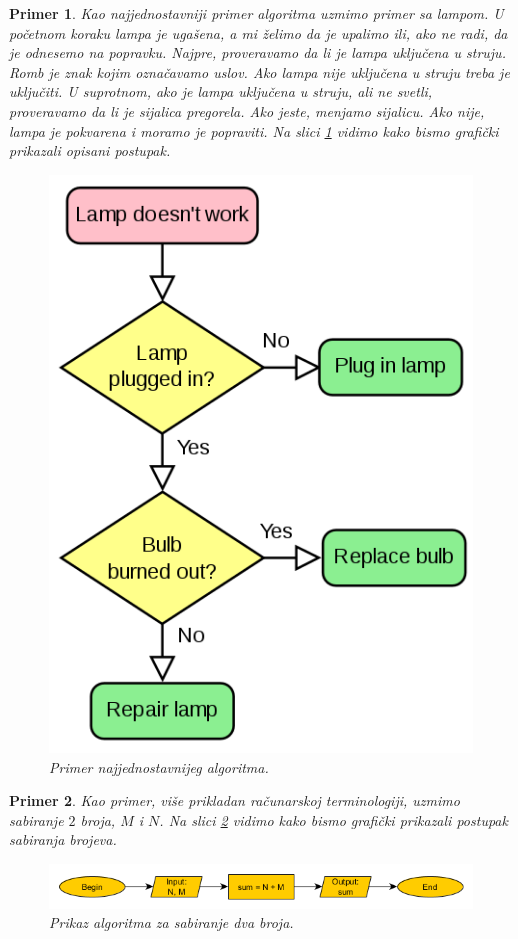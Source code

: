 \documentclass[a4paper]{article}
\newtheorem{primer}{Primer}[section]
\begin{document}
\begin{primer}
Kao najjednostavniji primer algoritma uzmimo primer sa lampom. U početnom koraku lampa je ugašena, a mi želimo da je upalimo ili, ako ne radi, da je odnesemo na popravku. Najpre, proveravamo da li je lampa uključena u struju. Romb je znak kojim označavamo uslov. Ako lampa nije uključena u struju treba je uključiti. U suprotnom, ako je lampa uključena u struju, ali ne svetli, proveravamo da li je sijalica pregorela. Ako jeste, menjamo sijalicu. Ako nije, lampa je pokvarena i moramo je popraviti. Na slici \ref{fig:alg0} vidimo kako bismo grafički prikazali opisani postupak.
\begin{figure}[h!]
\begin{center}
\includegraphics[scale=0.25]{pictures/lamp.png}
\end{center}
\caption{Primer najjednostavnijeg algoritma.}
\label{fig:alg0}
\end{figure}
\end{primer}

\begin{primer}
Kao primer, više prikladan računarskoj terminologiji, uzmimo sabiranje $2$ broja, $M$ i $N$. Na slici \ref{fig:alg1} vidimo kako bismo grafički prikazali postupak sabiranja brojeva.
\begin{figure}[h!]
\begin{center}
\includegraphics[scale=0.5]{pictures/sum-num-alg.png}
\end{center}
\caption{Prikaz algoritma za sabiranje dva broja.}
\label{fig:alg1}
\end{figure}
\end{primer}
\end{document}

